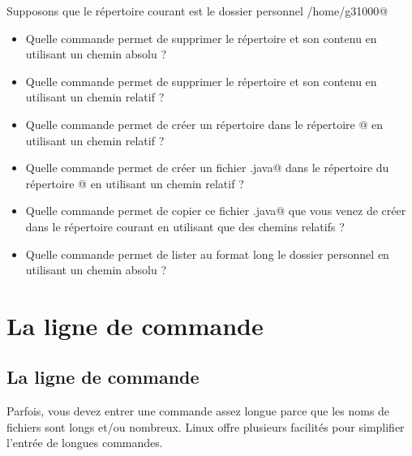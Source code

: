 \documentclass[11pt,a4paper]{article}
\begin{document}
							Supposons que le r\'epertoire courant est le dossier personnel \verb@/home/g31000@
					\begin{itemize}
				
			\item 
										Quelle commande permet de supprimer le r\'epertoire \verb@java@ et son contenu en utilisant un chemin absolu ?
										 \textcolor{gray}{\underline{\hspace*{16em}}} 
			\item 
										Quelle commande permet de supprimer le r\'epertoire \verb@java@ et son contenu en utilisant un chemin relatif ?
										 \textcolor{gray}{\underline{\hspace*{16em}}} 
			\item 
										Quelle commande permet de cr\'eer un r\'epertoire \verb@tds@ 
										dans le r\'epertoire @ en utilisant un chemin relatif ?
										 \textcolor{gray}{\underline{\hspace*{16em}}} 
			\item 
										Quelle commande permet de cr\'eer un fichier \verb@Ex.java@ 
										dans le r\'epertoire \verb@tds@ 
										du r\'epertoire @ en utilisant un chemin relatif ?
										 \textcolor{gray}{\underline{\hspace*{16em}}} 
			\item 
										Quelle commande permet de copier ce fichier \verb@Ex.java@ 
										que vous venez de cr\'eer dans le r\'epertoire courant en utilisant que des chemins relatifs ?
										 \textcolor{gray}{\underline{\hspace*{16em}}} 
			\item 
										Quelle commande permet de lister au format long le dossier personnel en utilisant un chemin absolu ?
										 \textcolor{gray}{\underline{\hspace*{5em}}} 
					\end{itemize}
				\section{La ligne de commande}\subsection{La ligne de commande}
          Parfois, vous devez entrer une commande assez longue parce que les noms de fichiers sont longs et/ou nombreux.
          Linux offre plusieurs facilit\'es pour simplifier l'entr\'ee de longues commandes.  
        
\end{document}
